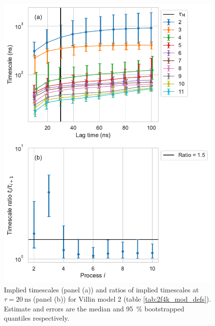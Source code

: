 \documentclass{article}
\begin{document}
\begin{figure}
    \centering
    \includegraphics[height=0.65\textheight]{figures/its/villin/Villin_model_logit(dist.)_method_m1.pdf}
    \caption{Implied timescales (panel (a)) and ratios of implied timescales at $\tau=\SI{20}{\nano\second}$ (panel (b)) for Villin model 2 (table \ref{tab:2f4k_mod_defs}). Estimate and errors are the median and \SI{95}{\percent} bootstrapped quantiles respectively.}
    \label{fig:its_villin_2}
\end{figure}
\end{document}

